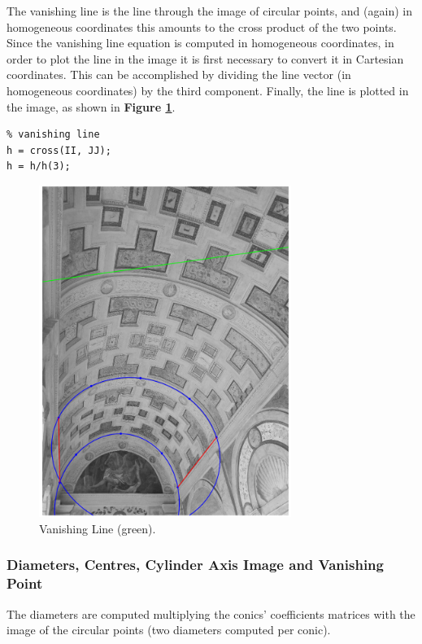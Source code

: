 \documentclass[12pt,a4paper]{article}
\begin{document}
The vanishing line is the line through the image of circular points, and (again) in homogeneous coordinates this amounts to the cross product of the two points. Since the vanishing line equation is computed in homogeneous coordinates, in order to plot the line in the image it is first necessary to convert it in Cartesian coordinates. This can be accomplished by dividing the line vector (in homogeneous coordinates) by the third component. Finally, the line is plotted in the image, as shown in \textbf{Figure \ref{fig:vanishingLine}}.

\begin{verbatim}
% vanishing line
h = cross(II, JJ);
h = h/h(3);
\end{verbatim}

\begin{figure}[H]
    \centering
    \includegraphics[width=0.73\textwidth]{Images/PalazzoTe_vanishing_line.png}
    \caption[Vanishing Line.]{Vanishing Line (green).}
    \label{fig:vanishingLine}
\end{figure}

\subsubsection{Diameters, Centres, Cylinder Axis Image and Vanishing Point}\label{sec:toAxisImageVanishingPoint}
The diameters are computed multiplying the conics' coefficients matrices with the image of the circular points (two diameters computed per conic).
\end{document}

